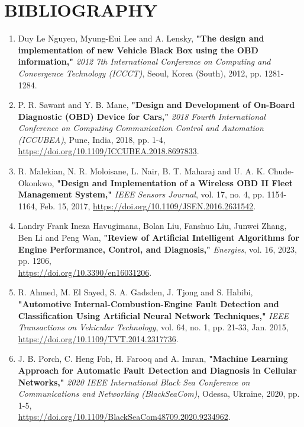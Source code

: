 \newpage
\chapter{BIBLIOGRAPHY}

\begin{enumerate}
    \item Duy Le Nguyen, Myung-Eui Lee and A. Lensky, \textbf{"The design and implementation of new Vehicle Black Box using the OBD information,"} \textit{2012 7th International Conference on Computing and Convergence Technology (ICCCT)}, Seoul, Korea (South), 2012, pp. 1281-1284.

    \item P. R. Sawant and Y. B. Mane, \textbf{"Design and Development of On-Board Diagnostic (OBD) Device for Cars,"} \textit{2018 Fourth International Conference on Computing Communication Control and Automation (ICCUBEA)}, Pune, India, 2018, pp. 1-4, \url{https://doi.org/10.1109/ICCUBEA.2018.8697833}.

    \item R. Malekian, N. R. Moloisane, L. Nair, B. T. Maharaj and U. A. K. Chude-Okonkwo, \textbf{"Design and Implementation of a Wireless OBD II Fleet Management System,"} \textit{IEEE Sensors Journal}, vol. 17, no. 4, pp. 1154-1164, Feb. 15, 2017, \url{https://doi.org/10.1109/JSEN.2016.2631542}.

    \item Landry Frank Ineza Havugimana, Bolan Liu, Fanshuo Liu, Junwei Zhang, Ben Li and Peng Wan, \textbf{"Review of Artificial Intelligent Algorithms for Engine Performance, Control, and Diagnosis,"} \textit{Energies}, vol. 16, 2023, pp. 1206,\\ \url{https://doi.org/10.3390/en16031206}.

    \item R. Ahmed, M. El Sayed, S. A. Gadsden, J. Tjong and S. Habibi, \textbf{"Automotive Internal-Combustion-Engine Fault Detection and Classification Using Artificial Neural Network Techniques,"} \textit{IEEE Transactions on Vehicular Technology}, vol. 64, no. 1, pp. 21-33, Jan. 2015,\\ \url{https://doi.org/10.1109/TVT.2014.2317736}.

    \item J. B. Porch, C. Heng Foh, H. Farooq and A. Imran, \textbf{"Machine Learning Approach for Automatic Fault Detection and Diagnosis in Cellular Networks,"} \textit{2020 IEEE International Black Sea Conference on Communications and Networking (BlackSeaCom)}, Odessa, Ukraine, 2020, pp. 1-5,\\ \url{https://doi.org/10.1109/BlackSeaCom48709.2020.9234962}.


\end{enumerate}
